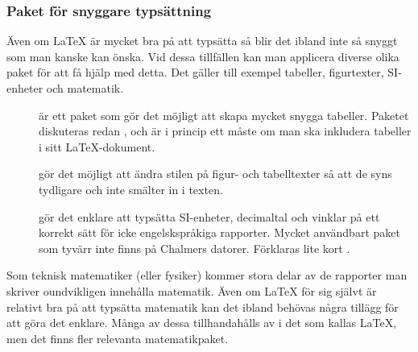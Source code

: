 \documentclass[../../latex.tex]{subfiles}
\begin{document}
\subsubsection{Paket för snyggare typsättning}
Även om \LaTeX{} är mycket bra på att typsätta så blir det ibland inte
så snyggt som man kanske kan önska. Vid dessa tillfällen kan man
applicera diverse olika paket för att få hjälp med detta. Det gäller
till exempel tabeller, figurtexter, SI-enheter och matematik.

\begin{description}
	\item[]
	är ett paket som gör det möjligt att skapa mycket snygga tabeller.
	Paketet diskuteras redan , och är i princip
	ett måste om man ska inkludera tabeller i sitt \LaTeX-dokument.

	\item[]
	gör det möjligt att ändra stilen på figur- och tabelltexter så att de
	syns tydligare och inte smälter in i texten.
	
	\item[\emph{}]
	gör det enklare att typsätta SI-enheter, decimaltal och vinklar på ett
	korrekt sätt för icke engelskspråkiga rapporter. Mycket användbart
	paket som tyvärr inte finns på Chalmers datorer. Förklaras lite kort
	.
\end{description}

Som teknisk matematiker (eller fysiker) kommer stora delar av de rapporter
man skriver oundvikligen innehålla matematik. Även om \LaTeX{} för sig
självt är relativt bra på att typsätta matematik kan det ibland behövas
några tillägg för att göra det enklare. Många av dessa tillhandahålls av
\AmS{} i det som kallas \AmS\LaTeX, men det finns fler relevanta
matematikpaket.
\end{document}
